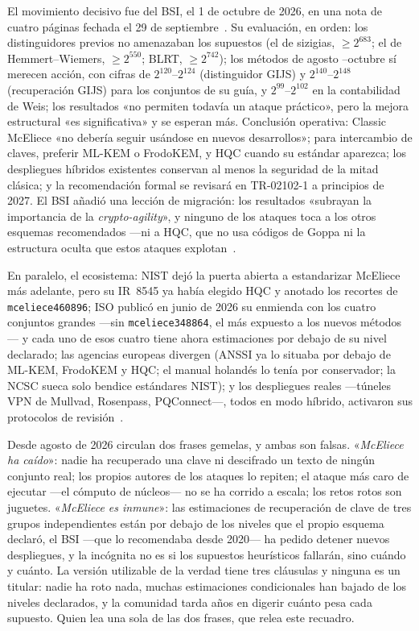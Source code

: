 \documentclass[11pt,a4paper,oneside]{report}
\begin{document}
El movimiento decisivo fue del BSI, el 1 de octubre de 2026, en una
nota de cuatro páginas fechada el 29 de septiembre~\cite{bsi2026}.
Su evaluación, en orden: los distinguidores previos no amenazaban
los supuestos (el de sizigias, $\ge 2^{683}$; el de
Hemmert--Wiemers, $\ge 2^{550}$; BLRT, $\ge 2^{742}$); los métodos
de agosto --octubre sí merecen acción, con cifras de $2^{120}$--$2^{124}$
(distinguidor GIJS) y $2^{140}$--$2^{148}$ (recuperación GIJS) para
los conjuntos de su guía, y $2^{99}$--$2^{102}$ en la contabilidad
de Weis; los resultados «no permiten todavía un ataque práctico»,
pero la mejora estructural «es significativa» y se esperan más.
Conclusión operativa: Classic McEliece «no debería seguir usándose
en nuevos desarrollos»; para intercambio de claves, preferir
ML-KEM o FrodoKEM, y HQC cuando su estándar aparezca; los
despliegues híbridos existentes conservan al menos la seguridad de
la mitad clásica; y la recomendación formal se revisará en
TR-02102-1 a principios de 2027. El BSI añadió una lección de
migración: los resultados «subrayan la importancia de la
\emph{crypto-agility}», y ninguno de los ataques toca a los otros
esquemas recomendados ---ni a HQC, que no usa códigos de Goppa ni la estructura
oculta que estos ataques explotan~\cite{bsi2026}.

En paralelo, el ecosistema: NIST dejó la puerta abierta a
estandarizar McEliece más adelante, pero su IR~8545 ya había
elegido HQC y anotado los recortes de \texttt{mceliece460896}; ISO
publicó en junio de 2026 su enmienda con los cuatro conjuntos
grandes ---sin \texttt{mceliece348864}, el más expuesto a los
nuevos métodos--- y cada uno de esos cuatro tiene ahora
estimaciones por debajo de su nivel declarado; las agencias
europeas divergen (ANSSI ya lo situaba por debajo de ML-KEM,
FrodoKEM y HQC; el manual holandés lo tenía por conservador; la
NCSC sueca solo bendice estándares NIST); y los despliegues reales
---túneles VPN de Mullvad, Rosenpass, PQConnect---, todos en modo
híbrido, activaron sus protocolos de revisión~\cite{bernstein2026,bsi2026,nist8545}.

\begin{trampa}
Desde agosto de 2026 circulan dos frases gemelas, y ambas son
falsas. «\emph{McEliece ha caído}»: nadie ha recuperado una clave
ni descifrado un texto de ningún conjunto real; los propios
autores de los ataques lo repiten; el ataque más caro de ejecutar
---el cómputo de núcleos--- no se ha corrido a escala; los retos
rotos son juguetes. «\emph{McEliece es inmune}»: las estimaciones
de recuperación de clave de tres grupos independientes están por
debajo de los niveles que el propio esquema declaró, el BSI ---que
lo recomendaba desde 2020--- ha pedido detener nuevos despliegues,
y la incógnita no es si los supuestos heurísticos fallarán, sino
cuándo y cuánto. La versión utilizable de la verdad tiene tres
cláusulas y ninguna es un titular: nadie ha roto nada, muchas
estimaciones condicionales han bajado de los niveles declarados, y
la comunidad tarda años en digerir cuánto pesa cada supuesto. Quien
lea una sola de las dos frases, que relea este recuadro.
\end{trampa}
\end{document}
